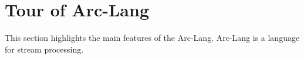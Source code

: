 \section{Tour of Arc-Lang}

This section highlights the main features of the Arc-Lang. Arc-Lang is a language for stream processing. 

% 
